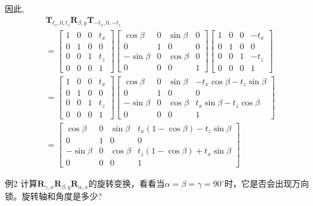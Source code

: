 因此,
$$
\begin{aligned}
& \mathbf{T}_{t_{x}, 0, t_{z}} \mathbf{R}_{\beta, y} \mathbf{T}_{-t_{x}, 0,-t_{z}} \\
&= {\left[\begin{array}{cccc}
1 & 0 & 0 & t_{x} \\
0 & 1 & 0 & 0 \\
0 & 0 & 1 & t_{z} \\
0 & 0 & 0 & 1
\end{array}\right]\left[\begin{array}{cccc}
\cos \beta & 0 & \sin \beta & 0 \\
0 & 1 & 0 & 0 \\
-\sin \beta & 0 & \cos \beta & 0 \\
0 & 0 & 0 & 1
\end{array}\right]\left[\begin{array}{cccc}
1 & 0 & 0 & -t_{x} \\
0 & 1 & 0 & 0 \\
0 & 0 & 1 & -t_{z} \\
0 & 0 & 0 & 1
\end{array}\right] } \\
&= {\left[\begin{array}{cccc}
1 & 0 & 0 & t_{x} \\
0 & 1 & 0 & 0 \\
0 & 0 & 1 & t_{z} \\
0 & 0 & 0 & 1
\end{array}\right]\left[\begin{array}{cccc}
\cos \beta & 0 & \sin \beta & -t_{x} \cos \beta-t_{z} \sin \beta \\
0 & 1 & 0 & 0 \\
-\sin \beta & 0 & \cos \beta & t_{x} \sin \beta-t_{z} \cos \beta \\
0 & 0 & 0 & 1
\end{array}\right] } \\
&= {\left[\begin{array}{ccccc}
\cos \beta & 0 & \sin \beta & t_{x}(1-\cos \beta)-t_{z} \sin \beta \\
0 & 1 & 0 & 0 \\
-\sin \beta & 0 & \cos \beta & t_{z}(1-\cos \beta)+t_{x} \sin \beta \\
0 & 0 & 0 & 1
\end{array}\right] }
\end{aligned}
$$

例2 计算$\mathbf{R}_{\gamma, x} \mathbf{R}_{\beta, y} \mathbf{R}_{\alpha, x}$的旋转变换，看看当$\alpha=\beta=\gamma=90^{\circ}$时，它是否会出现万向锁。旋转轴和角度是多少?


